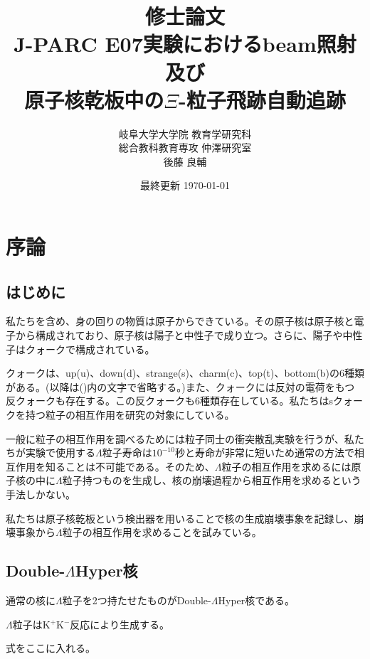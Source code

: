 \documentclass[12pt,a4paper]{jarticle}
\begin{document}
\begin{titlepage}
\title{\vspace{60mm} \LARGE 修士論文\vspace{10mm}\\J-PARC E07実験におけるbeam照射及び\\原子核乾板中の$\Xi$-粒子飛跡自動追跡}
\author{\Large 岐阜大学大学院 教育学研究科 \\ \vspace{5mm}
\Large 総合教科教育専攻 仲澤研究室 \\ \vspace{5mm}
\LARGE 後藤 良輔}
\date{最終更新 \today}
\maketitle
\thispagestyle{empty} %
\end{titlepage}

\thispagestyle{empty} %
\tableofcontents
\newpage
\section{序論}
\subsection{はじめに}
私たちを含め、身の回りの物質は原子からできている。その原子核は原子核と電子から構成されており、原子核は陽子と中性子で成り立つ。さらに、陽子や中性子はクォークで構成されている。\par
クォークは、up(u)、down(d)、strange(s)、charm(c)、top(t)、bottom(b)の6種類がある。(以降は()内の文字で省略する。)また、クォークには反対の電荷をもつ反クォークも存在する。この反クォークも6種類存在している。私たちはsクォークを持つ粒子の相互作用を研究の対象にしている。\par
一般に粒子の相互作用を調べるためには粒子同士の衝突散乱実験を行うが、私たちが実験で使用する$\Lambda$粒子寿命は$10^{-10}$秒と寿命が非常に短いため通常の方法で相互作用を知ることは不可能である。そのため、$\Lambda$粒子の相互作用を求めるには原子核の中に$\Lambda$粒子持つものを生成し、核の崩壊過程から相互作用を求めるという手法しかない。\par
私たちは原子核乾板という検出器を用いることで核の生成崩壊事象を記録し、崩壊事象から$\Lambda$粒子の相互作用を求めることを試みている。\par
\subsection{Double-$\Lambda$Hyper核}
通常の核に$\Lambda$粒子を2つ持たせたものがDouble-$\Lambda$Hyper核である。\par
$\Lambda$粒子はK$^+$K$^-$反応により生成する。\par
式をここに入れる。
\end{document}
